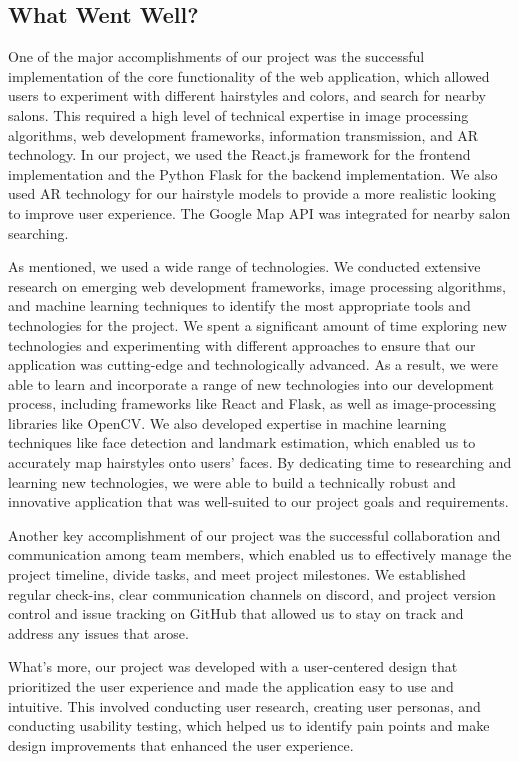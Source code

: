 \documentclass{article}
\begin{document}
\subsection{What Went Well?}

One of the major accomplishments of our project was the successful implementation of the core functionality of the web application, which allowed users to experiment with different hairstyles and colors, and search for nearby salons. This required a high level of technical expertise in image processing algorithms, web development frameworks, information transmission, and AR technology. In our project, we used the React.js framework for the frontend implementation and the Python Flask for the backend implementation. We also used AR technology for our hairstyle models to provide a more realistic looking to improve user experience. The Google Map API was integrated for nearby salon searching. 

As mentioned, we used a wide range of technologies. We conducted extensive research on emerging web development frameworks, image processing algorithms, and machine learning techniques to identify the most appropriate tools and technologies for the project. We spent a significant amount of time exploring new technologies and experimenting with different approaches to ensure that our application was cutting-edge and technologically advanced. As a result, we were able to learn and incorporate a range of new technologies into our development process, including frameworks like React and Flask, as well as image-processing libraries like OpenCV. We also developed expertise in machine learning techniques like face detection and landmark estimation, which enabled us to accurately map hairstyles onto users' faces. By dedicating time to researching and learning new technologies, we were able to build a technically robust and innovative application that was well-suited to our project goals and requirements.

Another key accomplishment of our project was the successful collaboration and communication among team members, which enabled us to effectively manage the project timeline, divide tasks, and meet project milestones. We established regular check-ins, clear communication channels on discord, and project version control and issue tracking on GitHub that allowed us to stay on track and address any issues that arose.

What's more, our project was developed with a user-centered design that prioritized the user experience and made the application easy to use and intuitive. This involved conducting user research, creating user personas, and conducting usability testing, which helped us to identify pain points and make design improvements that enhanced the user experience.
\end{document}
